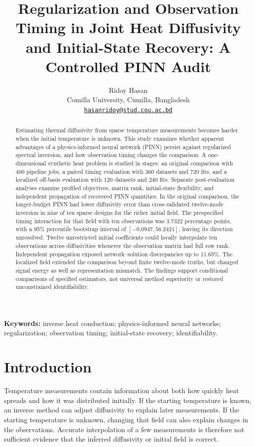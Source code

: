 \documentclass[11pt,a4paper]{article}
\title{Regularization and Observation Timing in Joint Heat Diffusivity and Initial-State Recovery: A Controlled PINN Audit}
\author{Ridoy Hasan\\Comilla University, Cumilla, Bangladesh\\
\href{mailto:hasanridoy@stud.cou.ac.bd}{\texttt{hasanridoy@stud.cou.ac.bd}}}
\date{}
\begin{document}
\maketitle
\begin{abstract}
Estimating thermal diffusivity from sparse temperature measurements becomes harder when the initial temperature is unknown. This study examines whether apparent advantages of a physics-informed neural network (PINN) persist against regularized spectral inversion, and how observation timing changes the comparison. A one-dimensional synthetic heat problem is studied in stages: an original comparison with 400 pipeline jobs, a paired timing evaluation with 360 datasets and 720 fits, and a localized off-basis evaluation with 120 datasets and 240 fits. Separate post-evaluation analyses examine profiled objectives, matrix rank, initial-state flexibility, and independent propagation of recovered PINN quantities. In the original comparison, the longer-budget PINN had lower diffusivity error than cross-validated twelve-mode inversion in nine of ten sparse designs for the richer initial field. The prespecified timing interaction for that field with ten observations was 3.7322 percentage points, with a 95\% percentile bootstrap interval of $[-0.0947,56.2421]$, leaving its direction unresolved. Twelve unrestricted initial coefficients could locally interpolate ten observations across diffusivities whenever the observation matrix had full row rank. Independent propagation exposed network--solution discrepancies up to 11.65\%. The localized field extended the comparison beyond finite twelve-mode truths, but changed signal energy as well as representation mismatch. The findings support conditional comparisons of specified estimators, not universal method superiority or restored unconstrained identifiability.
\end{abstract}
\noindent\textbf{Keywords:} inverse heat conduction; physics-informed neural networks; regularization; observation timing; initial-state recovery; identifiability.

\section{Introduction}
Temperature measurements contain information about both how quickly heat spreads and how it was distributed initially. If the starting temperature is known, an inverse method can adjust diffusivity to explain later measurements. If the starting temperature is unknown, changing that field can also explain changes in the observations. Accurate interpolation of a few measurements is therefore not sufficient evidence that the inferred diffusivity or initial field is correct.
\end{document}
